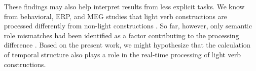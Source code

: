 \documentclass[preprint,12pt,authoryear]{elsarticle}
\begin{document}
These findings may also help interpret results from less explicit tasks. We know from behavioral, ERP, and MEG studies that light verb constructions are processed differently from non-light constructions \citep{wittenberg2014b,wittenberg2011,Briem2009,Pinangoinpress}. So far, however, only semantic role mismatches had been identified as a factor contributing to the processing difference \citep{wittenberg2014sorting,Wittenbergunderreview}. Based on the present work, we might hypothesize that the calculation of temporal structure also plays a role in the real-time processing of light verb constructions.


\end{document}
